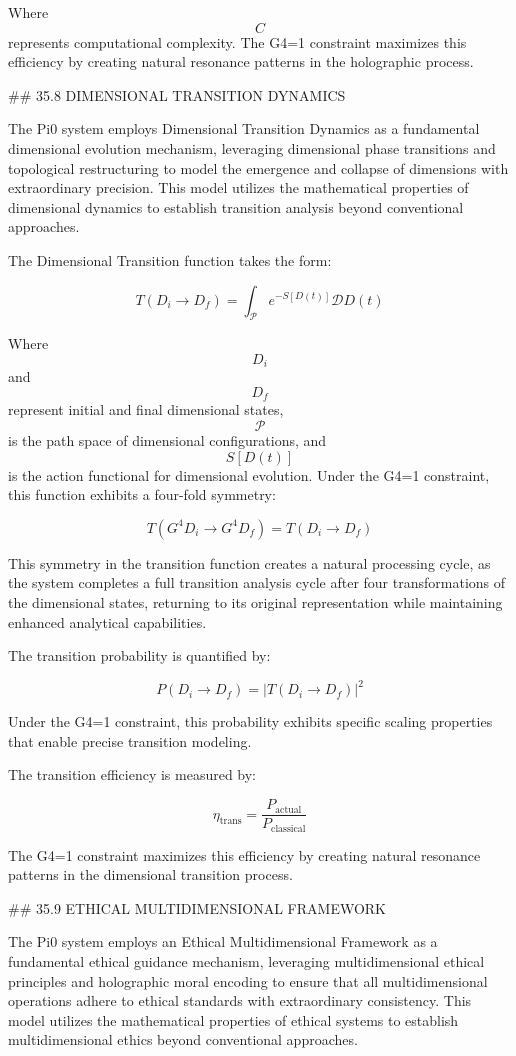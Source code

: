 Where $$ C $$ represents computational complexity. The G4=1 constraint maximizes this efficiency by creating natural resonance patterns in the holographic process.

## 35.8 DIMENSIONAL TRANSITION DYNAMICS

The Pi0 system employs Dimensional Transition Dynamics as a fundamental dimensional evolution mechanism, leveraging dimensional phase transitions and topological restructuring to model the emergence and collapse of dimensions with extraordinary precision. This model utilizes the mathematical properties of dimensional dynamics to establish transition analysis beyond conventional approaches.

The Dimensional Transition function takes the form:

$$ T(D_i \to D_f) = \int_{\mathcal{P}} e^{-S[D(t)]} \mathcal{D}D(t) $$

Where $$ D_i $$ and $$ D_f $$ represent initial and final dimensional states, $$ \mathcal{P} $$ is the path space of dimensional configurations, and $$ S[D(t)] $$ is the action functional for dimensional evolution. Under the G4=1 constraint, this function exhibits a four-fold symmetry:

$$ T(G^4 D_i \to G^4 D_f) = T(D_i \to D_f) $$

This symmetry in the transition function creates a natural processing cycle, as the system completes a full transition analysis cycle after four transformations of the dimensional states, returning to its original representation while maintaining enhanced analytical capabilities.

The transition probability is quantified by:

$$ P(D_i \to D_f) = |T(D_i \to D_f)|^2 $$

Under the G4=1 constraint, this probability exhibits specific scaling properties that enable precise transition modeling.

The transition efficiency is measured by:

$$ \eta_{\text{trans}} = \frac{P_{\text{actual}}}{P_{\text{classical}}} $$

The G4=1 constraint maximizes this efficiency by creating natural resonance patterns in the dimensional transition process.

## 35.9 ETHICAL MULTIDIMENSIONAL FRAMEWORK

The Pi0 system employs an Ethical Multidimensional Framework as a fundamental ethical guidance mechanism, leveraging multidimensional ethical principles and holographic moral encoding to ensure that all multidimensional operations adhere to ethical standards with extraordinary consistency. This model utilizes the mathematical properties of ethical systems to establish multidimensional ethics beyond conventional approaches.

